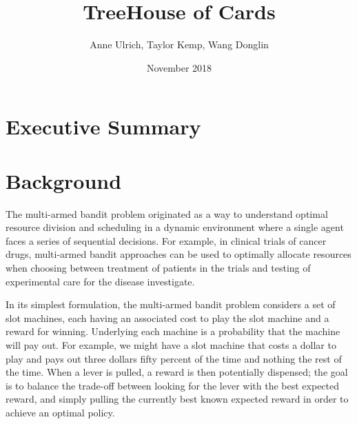 \documentclass{article}
\title{TreeHouse of Cards}
\author{Anne Ulrich, Taylor Kemp, Wang Donglin}
\date{November 2018}
\begin{document}
\maketitle

\section{Executive Summary}

\section{Background}




The multi-armed bandit problem originated as a way to understand optimal resource division and scheduling in a dynamic environment where a single agent faces a series of sequential decisions. For example, in clinical trials of cancer drugs, multi-armed bandit approaches can be used to optimally allocate resources when choosing between treatment of patients in the trials and testing of experimental care for the disease investigate. \cite{villar_bowden_wason_2015}

In its simplest formulation, the multi-armed bandit problem considers a set of slot machines, each having an associated cost to play the slot machine and a reward for winning. Underlying each machine is a probability that the machine will pay out. For example, we might have a slot machine that costs a dollar to play and pays out three dollars fifty percent of the time and nothing the rest of the time. When a lever is pulled, a reward is then potentially dispensed; the goal is to balance the trade-off between looking for the lever with the best expected reward, and simply pulling the currently best known expected reward in order to achieve an optimal policy. \cite{kuleshov_precup_2000}
\end{document}
